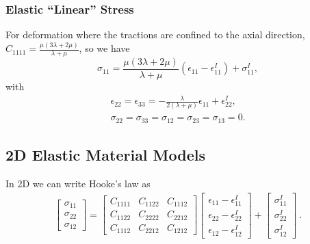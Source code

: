 \subsubsection{Elastic ``Linear'' Stress}

For deformation where the tractions are confined to the axial direction,
$C_{1111}=\frac{\mu(3\lambda+2\mu)}{\lambda+\mu}$, so we have
\begin{equation}
\sigma_{11}=\frac{\mu(3\lambda+2\mu)}{\lambda+\mu}\left(\epsilon_{11}-\epsilon_{11}^{I}\right)+\sigma_{11}^{I},\label{eq:7}
\end{equation}
with
\begin{gather}
\epsilon_{22}=\epsilon_{33}=-\frac{\lambda}{2(\lambda+\mu)}\epsilon_{11}+\epsilon_{22}^{I},\label{eq:8}\\
\sigma_{22}=\sigma_{33}=\sigma_{12}=\sigma_{23}=\sigma_{13}=0.\nonumber 
\end{gather}



\subsection{2D Elastic Material Models}

In 2D we can write Hooke's law as
\begin{gather}
\left[\begin{array}{c}
\sigma_{11}\\
\sigma_{22}\\
\sigma_{12}
\end{array}\right]=\left[\begin{array}{ccc}
C_{1111} & C_{1122} & C_{1112}\\
C_{1122} & C_{2222} & C_{2212}\\
C_{1112} & C_{2212} & C_{1212}
\end{array}\right]\left[\begin{array}{c}
\epsilon_{11}-\epsilon_{11}^{I}\\
\epsilon_{22}-\epsilon_{22}^{I}\\
\epsilon_{12}-\epsilon_{12}^{I}
\end{array}\right]+\left[\begin{array}{c}
\sigma_{11}^{I}\\
\sigma_{22}^{I}\\
\sigma_{12}^{I}
\end{array}\right]\:.\label{eq:9}
\end{gather}



